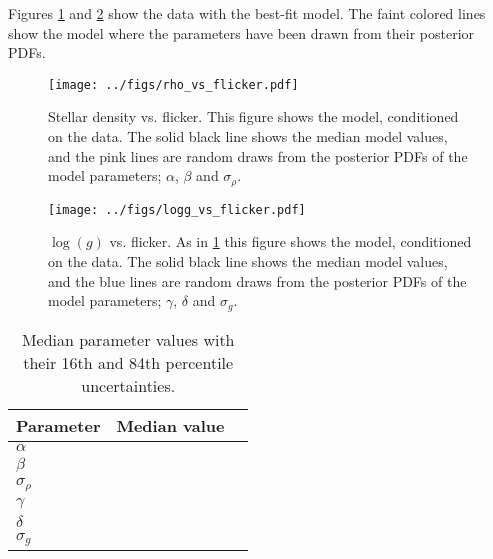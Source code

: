 Figures \ref{fig:rhostar} and \ref{fig:logg} show the data with the best-fit
model.
The faint colored lines show the model where the parameters have been drawn
from their posterior PDFs.

\begin{figure}
\begin{center}
\texttt{[image: ../figs/rho\_vs\_flicker.pdf]}
\caption{
Stellar density vs. flicker. This figure shows the model, conditioned on the
data. The solid black line shows the median model values, and the pink lines
are random draws from the posterior PDFs of the model parameters; $\alpha$,
$\beta$ and $\sigma_{\rho}$.
}
\label{fig:rhostar}
\end{center}
\end{figure}

\begin{figure}
\begin{center}
\texttt{[image: ../figs/logg\_vs\_flicker.pdf]}
\caption{
$\log(g)$ vs. flicker. As in \ref{fig:rhostar} this figure shows
the model, conditioned on the data. The solid black line shows the median model
values, and the blue lines are random draws from the posterior PDFs of the
model parameters; $\gamma$, $\delta$ and $\sigma_g$.
}
\label{fig:logg}
\end{center}
\end{figure}

\begin{table}
\caption{Median parameter values with their 16th and 84th percentile
	 uncertainties.}
\begin{tabular}{lcc}
\hline\hline
    Parameter & Median value \\
    \hline
    $\alpha$         &   \\
    $\beta$          &   \\
    $\sigma_{\rho}$  &   \\
    $\gamma$         &   \\
    $\delta$         &   \\
    $\sigma_{g}$     &   \\
    \hline
\end{tabular}
\end{table}

